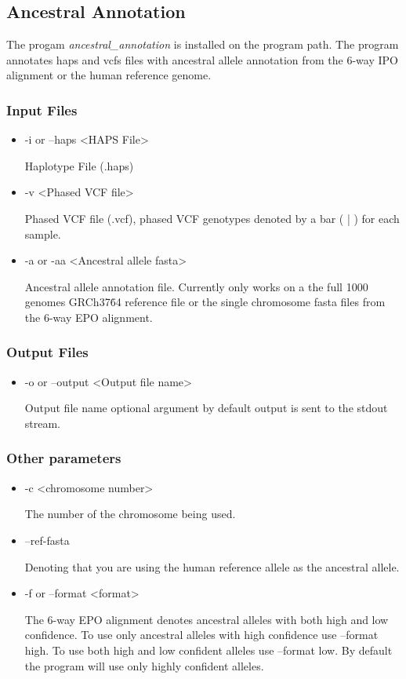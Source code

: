 \documentclass[a4paper,10pt]{article}
\begin{document}
\subsection{Ancestral Annotation}
The progam \emph{ancestral\_annotation} is installed on the program path. The program annotates haps and vcfs files with ancestral allele annotation from the 6-way IPO alignment or the human reference genome.
\subsubsection{Input Files}
\begin{itemize}
\item -i or --haps <HAPS File>

Haplotype File (.haps)

\item -v <Phased VCF file>

Phased VCF file (.vcf), phased VCF genotypes denoted by a bar ( | ) for each sample.
\item -a or -aa <Ancestral allele fasta>

Ancestral allele annotation file. Currently only works on a the full 1000 genomes GRCh37\.64 reference file or the single chromosome fasta files from the 6-way EPO alignment.
\end{itemize}
\subsubsection{Output Files}
\begin{itemize}
\item -o or --output <Output file name>

Output file name optional argument by default output is sent to the stdout stream.
\end{itemize}
\subsubsection{Other parameters}
\begin{itemize}
\item -c <chromosome number>

The number of the chromosome being used.

\item --ref-fasta

Denoting that you are using the human reference allele as the ancestral allele. 
\item -f or --format <format>

The 6-way EPO alignment denotes ancestral alleles with both high and low confidence. To use only ancestral alleles with high confidence use --format high. To use both high and low confident alleles use --format low. By default the program will use only highly confident alleles.
\end{itemize}
\end{document}
